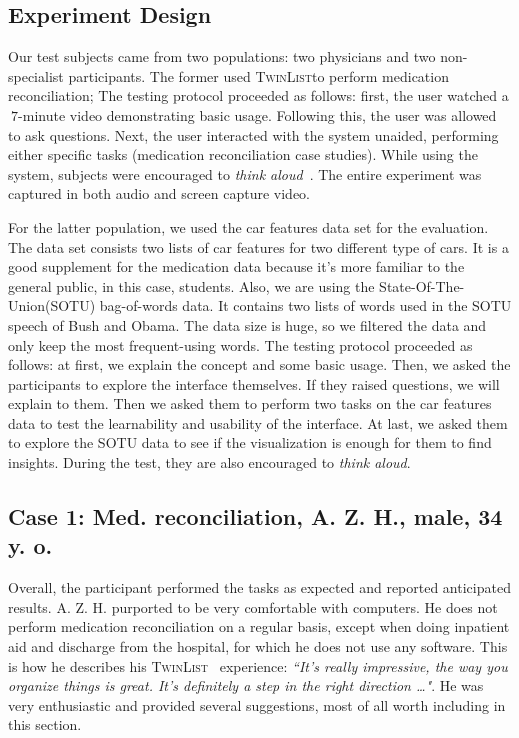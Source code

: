 \documentclass{chi2009}
\newcommand{\TwinList}{\textsc{TwinList}}
\begin{document}
\subsection{Experiment Design}
Our test subjects came from two populations: two physicians and two non-specialist participants. The former used \TwinList to perform medication reconciliation; The testing protocol proceeded as follows: first, the user watched a $~7$-minute video demonstrating basic usage. Following this, the user was allowed to ask questions. Next, the user interacted with the system unaided, performing either specific tasks (medication reconciliation case studies). While using the system, subjects were encouraged to \textit{think aloud}~\cite{lewis-1982}. The entire experiment was captured in both audio and screen capture video. 

For the latter population, we used the car features data set for the evaluation. The data set consists two lists of car features for two different type of cars. It is a good supplement for the medication data because it's more familiar to the general public, in this case, students. Also, we are using the State-Of-The-Union(SOTU) bag-of-words data. It contains two lists of words used in the SOTU speech of Bush and Obama. The data size is huge, so we filtered the data and only keep the most frequent-using words. The testing protocol proceeded as follows: at first, we explain the concept and some basic usage. Then, we asked the participants to explore the interface themselves. If they raised questions, we will explain to them. Then we asked them to perform two tasks on the car features data to test the learnability and usability of the interface. At last, we asked them to explore the SOTU data to see if the visualization is enough for them to find insights. During the test, they are also encouraged to \textit{think aloud}.

\subsection{Case 1: Med. reconciliation, A. Z. H., male, 34 y. o.}
Overall, the participant performed the tasks as expected and reported anticipated results. A. Z. H. purported to be very comfortable with computers. He does not perform medication reconciliation on a regular basis, except when doing inpatient aid and discharge from the hospital, for which he does not use any software. This is how he describes his \TwinList~ experience: \textit{``It's really impressive, the way you organize things is great. It's definitely a step in the right direction \dots"}. He was very enthusiastic and provided several suggestions, most of all worth including in this section. 
\end{document}
